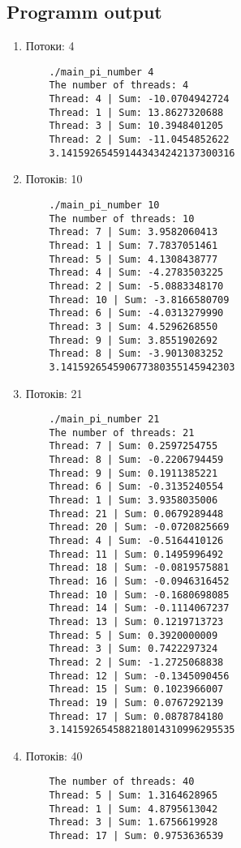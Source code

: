 \documentclass{article}
\begin{document}
\subsection{Programm output}
\begin{enumerate}
	\normalsize
	\item Потоки: 4\vspace{-3mm}
	\begin{verbatim}
	./main_pi_number 4
	The number of threads: 4
	Thread: 4 | Sum: -10.0704942724
	Thread: 1 | Sum: 13.8627320688
	Thread: 3 | Sum: 10.3948401205
	Thread: 2 | Sum: -11.0454852622
	3.141592654591443434242137300316
	\end{verbatim}
	\item Потоків: 10\vspace{-3mm}
	\begin{verbatim}
	./main_pi_number 10
	The number of threads: 10
	Thread: 7 | Sum: 3.9582060413
	Thread: 1 | Sum: 7.7837051461
	Thread: 5 | Sum: 4.1308438777
	Thread: 4 | Sum: -4.2783503225
	Thread: 2 | Sum: -5.0883348170
	Thread: 10 | Sum: -3.8166580709
	Thread: 6 | Sum: -4.0313279990
	Thread: 3 | Sum: 4.5296268550
	Thread: 9 | Sum: 3.8551902692
	Thread: 8 | Sum: -3.9013083252
	3.141592654590677380355145942303
	\end{verbatim}
	\item Потоків: 21 \vspace{-3mm}
	\begin{verbatim}
	./main_pi_number 21
	The number of threads: 21
	Thread: 7 | Sum: 0.2597254755
	Thread: 8 | Sum: -0.2206794459
	Thread: 9 | Sum: 0.1911385221
	Thread: 6 | Sum: -0.3135240554
	Thread: 1 | Sum: 3.9358035006
	Thread: 21 | Sum: 0.0679289448
	Thread: 20 | Sum: -0.0720825669
	Thread: 4 | Sum: -0.5164410126
	Thread: 11 | Sum: 0.1495996492
	Thread: 18 | Sum: -0.0819575881
	Thread: 16 | Sum: -0.0946316452
	Thread: 10 | Sum: -0.1680698085
	Thread: 14 | Sum: -0.1114067237
	Thread: 13 | Sum: 0.1219713723
	Thread: 5 | Sum: 0.3920000009
	Thread: 3 | Sum: 0.7422297324
	Thread: 2 | Sum: -1.2725068838
	Thread: 12 | Sum: -0.1345090456
	Thread: 15 | Sum: 0.1023966007
	Thread: 19 | Sum: 0.0767292139
	Thread: 17 | Sum: 0.0878784180
	3.141592654588218014310996295535
	\end{verbatim}
	\item Потоків: 40\vspace{-3mm}
	\begin{verbatim}
	The number of threads: 40
	Thread: 5 | Sum: 1.3164628965
	Thread: 1 | Sum: 4.8795613042
	Thread: 3 | Sum: 1.6756619928
	Thread: 17 | Sum: 0.9753636539

\end{verbatim}
\end{enumerate}
\end{document}
